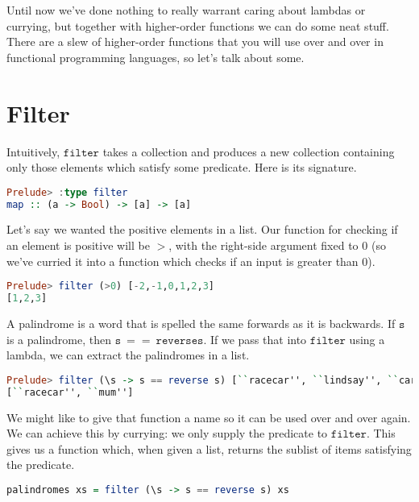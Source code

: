 \documentclass[a4paper,12pt]{article}
\newcommand{\kwa}[1]{\mathtt{#1}}
\begin{document}
\noindent
Until now we've done nothing to really warrant caring about lambdas or currying, but together with higher-order functions we can do some neat stuff. There are a slew of higher-order functions that you will use over and over in functional programming languages, so let's talk about some.

\section{Filter}

\noindent
Intuitively, $\kwa{filter}$ takes a collection and produces a new collection containing only those elements which satisfy some predicate. Here is its signature.

\begin{lstlisting}[language=Haskell]
Prelude> :type filter
map :: (a -> Bool) -> [a] -> [a]
\end{lstlisting}

\noindent
Let's say we wanted the positive elements in a list. Our function for checking if an element is positive will be $\kwa{>}$, with the right-side argument fixed to 0 (so we've curried it into a function which checks if an input is greater than $0$).

\begin{lstlisting}[language=Haskell]
Prelude> filter (>0) [-2,-1,0,1,2,3]
[1,2,3]
\end{lstlisting}

\noindent
A palindrome is a word that is spelled the same forwards as it is backwards. If $\kwa{s}$ is a palindrome, then $\kwa{s~==~reverse s}$. If we pass that into $\kwa{filter}$ using a lambda, we can extract the palindromes in a list.

\begin{lstlisting}[language=Haskell]
Prelude> filter (\s -> s == reverse s) [``racecar'', ``lindsay'', ``carpet'', ``mum'']
[``racecar'', ``mum'']
\end{lstlisting}

\noindent
We might like to give that function a name so it can be used over and over again. We can achieve this by currying: we only supply the predicate to $\kwa{filter}$. This gives us a function which, when given a list, returns the sublist of items satisfying the predicate.

\begin{lstlisting}[language=Haskell]
palindromes xs = filter (\s -> s == reverse s) xs
\end{lstlisting} 
\end{document}
